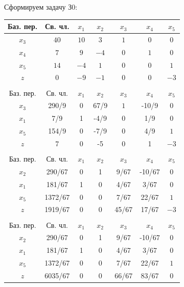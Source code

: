 \documentclass[a4paper,14pt]{extarticle}
\begin{document}
Сформируем задачу З0:
\begin{center}
    \begin{longtable}{|c|c|c|c|c|c|c|}
        \hline
        Баз. пер. & Св. чл. & $x_1$ & $x_2$ & $x_3$ & $x_4 $ & $x_5$ \\
        \hline
        $x_3$     & $40$    & $10$  & $3$   & $1$   & $0$    & $0$   \\
        \hline
        $x_4$     & $7$     & $9$   & $-4$  & $0$   & $1$    & $0$   \\
        \hline
        $x_5$     & $14$    & $-4$  & $1$   & $0$   & $0$    & $1$   \\
        \hline
        $z$       & $0$     & $-9$  & $-1$  & $0$   & $0$    & $-3$  \\
        \hline
        \multicolumn{7}{c}{}                                         \\
        \hline
        Баз. пер. & Св. чл. & $x_1$ & $x_2$ & $x_3$ & $x_4 $ & $x_5$ \\
        \hline
        $x_3$     & 290/9   & 0     & 67/9  & $1$   & -10/9  & $0$   \\
        \hline
        $x_1$     & 7/9     & 1     & -4/9  & $0$   & 1/9    & $0$   \\
        \hline
        $x_5$     & 154/9   & 0     & -7/9  & $0$   & 4/9    & $1$   \\
        \hline
        $z$       & 7       & 0     & -5    & $0$   & 1      & $-3$  \\
        \hline
        \multicolumn{7}{c}{}                                         \\
        \hline
        Баз. пер. & Св. чл. & $x_1$ & $x_2$ & $x_3$ & $x_4 $ & $x_5$ \\
        \hline
        $x_2$     & 290/67  & 0     & 1     & 9/67  & -10/67 & $0$   \\
        \hline
        $x_1$     & 181/67  & 1     & 0     & 4/67  & 3/67   & $0$   \\
        \hline
        $x_5$     & 1372/67 & 0     & 0     & 7/67  & 22/67  & $1$   \\
        \hline
        $z$       & 1919/67 & 0     & 0     & 45/67 & 17/67  & $-3$  \\
        \hline
        \multicolumn{7}{c}{}                                         \\
        \hline
        Баз. пер. & Св. чл. & $x_1$ & $x_2$ & $x_3$ & $x_4 $ & $x_5$ \\
        \hline
        $x_2$     & 290/67  & 0     & 1     & 9/67  & -10/67 & $0$   \\
        \hline
        $x_1$     & 181/67  & 1     & 0     & 4/67  & 3/67   & $0$   \\
        \hline
        $x_5$     & 1372/67 & 0     & 0     & 7/67  & 22/67  & $1$   \\
        \hline
        $z$       & 6035/67 & 0     & 0     & 66/67 & 83/67  & 0     \\
        \hline
    \end{longtable}
\end{center}
\end{document}
